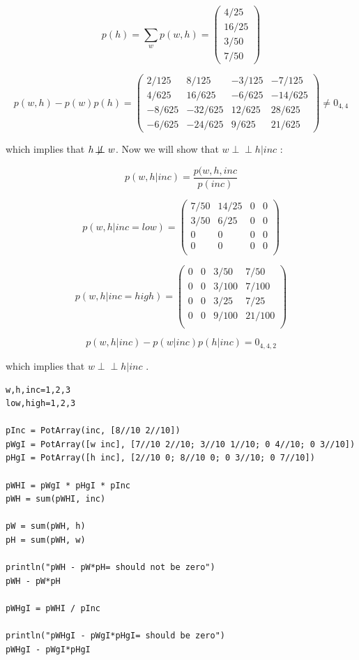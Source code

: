 \documentclass[11pt,a4paper,oneside]{report}
\newcommand\ci{\perp\!\!\!\perp} %
\begin{document}
$$p(h) = \sum_{w}p(w,h) = 
\begin{pmatrix}
4/25\\
16/25\\
3/50\\
7/50
\end{pmatrix}
$$

$$p(w,h) - p(w)p(h) = 
\begin{pmatrix}
  2/125 &   8/125 & -3/125 &  -7/125\\
  4/625 &  16/625 & -6/625 & -14/625\\
 -8/625 & -32/625 & 12/625 &  28/625\\
 -6/625 & -24/625 &  9/625 &  21/625
\end{pmatrix} \neq 0_{4,4}
$$

which implies that  $h \not\!\perp\!\!\!\perp w$. Now we will show that $ w 
\ci h | inc$ :

$$ p(w,h| inc) = \frac{p(w,h,inc}{p(inc)} $$

$$ p(w,h | inc = low) = 
\begin{pmatrix}
 7/50 & 14/25 & 0 & 0\\
 3/50 &  6/25 & 0 & 0\\
 0   & 0  & 0 & 0\\
 0   & 0  & 0 & 0\\
\end{pmatrix}
$$

$$ p(w,h | inc = high) = 
\begin{pmatrix}
 0 & 0 & 3/50  &  7/50\\ 
 0 & 0 & 3/100 &  7/100\\
 0 & 0 & 3/25  &  7/25 \\
 0 & 0 & 9/100 & 21/100\\
\end{pmatrix}
$$

$$p(w,h|inc) - p(w|inc)p(h|inc) = 0_{4,4,2}
$$

which implies that $ w \ci h | inc$ . 
\begin{lstlisting}
w,h,inc=1,2,3
low,high=1,2,3

pInc = PotArray(inc, [8//10 2//10])
pWgI = PotArray([w inc], [7//10 2//10; 3//10 1//10; 0 4//10; 0 3//10])
pHgI = PotArray([h inc], [2//10 0; 8//10 0; 0 3//10; 0 7//10])

pWHI = pWgI * pHgI * pInc
pWH = sum(pWHI, inc)

pW = sum(pWH, h)
pH = sum(pWH, w)

println("pWH - pW*pH= should not be zero")
pWH - pW*pH

pWHgI = pWHI / pInc

println("pWHgI - pWgI*pHgI= should be zero")
pWHgI - pWgI*pHgI


\end{lstlisting}
\end{document}
